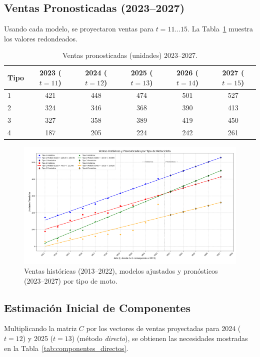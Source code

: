 \documentclass[12pt,a4paper]{article}
\newcommand{\tablesmall}{\scriptsize}
\begin{document}
\subsection{Ventas Pronosticadas (2023–2027)}
Usando cada modelo, se proyectaron ventas para $t=11\dots15$. La Tabla~\ref{tab:ventas_pronostico} muestra los valores redondeados.

\begin{table}[H]
\tablesmall
\centering
\caption{Ventas pronosticadas (unidades) 2023–2027.}
\label{tab:ventas_pronostico}
\begin{tabular}{@{}lccccc@{}}
\toprule
Tipo & 2023 ($t=11$) & 2024 ($t=12$) & 2025 ($t=13$) & 2026 ($t=14$) & 2027 ($t=15$) \\ \midrule
1 & 421 & 448 & 474 & 501 & 527 \\
2 & 324 & 346 & 368 & 390 & 413 \\
3 & 327 & 358 & 389 & 419 & 450 \\
4 & 187 & 205 & 224 & 242 & 261 \\ \bottomrule
\end{tabular}
\end{table}

\begin{figure}[H]
\centering
\includegraphics[width=0.7\linewidth]{Ventas historicas y pronosticadas por tipo moto.png}
\caption{Ventas históricas (2013–2022), modelos ajustados y pronósticos (2023–2027) por tipo de moto.}
\label{fig:ventas_combinada_img}
\end{figure}

\subsection{Estimación Inicial de Componentes}
Multiplicando la matriz $C$ por los vectores de ventas proyectadas para 2024 ($t=12$) y 2025 ($t=13$) (método \textit{directo}), se obtienen las necesidades mostradas en la Tabla~\ref{tab:componentes_directos}.
\end{document}
